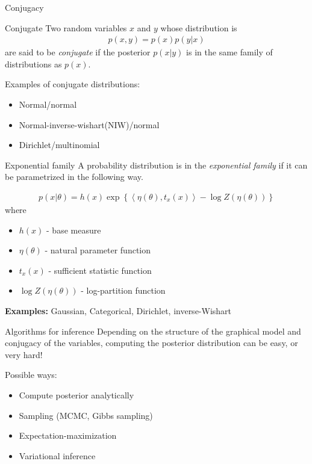 \documentclass[10pt, compress]{beamer}
\begin{document}
\begin{frame}{Conjugacy}
  \begin{block}{Conjugate}
    Two random variables $x$ and $y$ whose distribution is
    \begin{align*}p(x, y) = p(x)p(y | x)\end{align*} are said to be
      \emph{conjugate} if the posterior $p(x | y)$
    is in the same family of distributions as $p(x)$.
  \end{block}
  \pause
  Examples of conjugate distributions:
  \begin{itemize}
    \item Normal/normal
      \pause
    \item Normal-inverse-wishart(NIW)/normal
      \pause
    \item Dirichlet/multinomial
  \end{itemize}
\end{frame}

\begin{frame}{Exponential family}
  A probability distribution is in the \emph{exponential family}
  if it can be parametrized in the following way.

  \pause

  \begin{align*}
    p(x | \theta) = h(x)\exp\left\{\left\langle\eta(\theta), t_x(x)\right\rangle - \log Z(\eta(\theta))\right\}
  \end{align*}
  where
  \begin{itemize}
      \pause
    \item $h(x)$ - base measure
      \pause
    \item $\eta(\theta)$ - natural parameter function
      \pause
    \item $t_x(x)$ - sufficient statistic function
      \pause
    \item $\log Z(\eta(\theta))$ - log-partition function
  \end{itemize}
  \pause
  \textbf{Examples:} Gaussian, Categorical, Dirichlet, inverse-Wishart
\end{frame}

\begin{frame}{Algorithms for inference}
  Depending on the structure of the graphical model
  and conjugacy of the variables, computing the posterior distribution
  can be easy, or very hard!

  \pause
  Possible ways:
  \begin{itemize}
    \item<2-> Compute posterior analytically
      \pause
    \item<3-> Sampling (MCMC, Gibbs sampling)
      \pause
    \item<4-> Expectation-maximization
      \pause
    \item<5->\alert<6->{Variational inference}
  \end{itemize}
  \pause
\end{frame}
\end{document}
